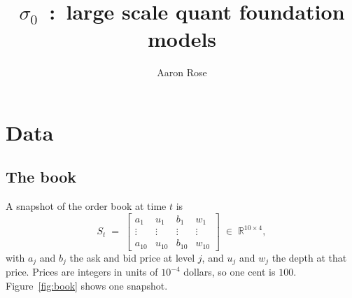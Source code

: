 \documentclass[10pt,a4paper]{article}
\title{$\sigma_0$ \,:\, large scale quant foundation models}
\author{Aaron Rose}
\begin{document}
\maketitle
\boldcontents

\section{Data}

\subsection{The book}

A snapshot of the order book at time $t$ is
%
\begin{equation}
S_t \;=\;
\begin{bmatrix}
a_1 & u_1 & b_1 & w_1 \\[1pt]
\vdots & \vdots & \vdots & \vdots \\[1pt]
a_{10} & u_{10} & b_{10} & w_{10}
\end{bmatrix}
\;\in\; \mathbb{R}^{10\times 4},
\label{eq:snapshot}
\end{equation}
%
with $a_j$ and $b_j$ the ask and bid price at level $j$, and $u_j$ and $w_j$
the depth at that price. Prices are integers in units of $10^{-4}$ dollars, so
one cent is $100$. Figure~\ref{fig:book} shows one snapshot.
\end{document}
